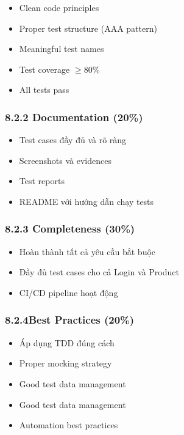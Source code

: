 \documentclass[a4paper,12pt]{article}
\begin{document}
\begin{itemize}
    \item Clean code principles
    \item Proper test structure (AAA pattern)
    \item Meaningful test names
    \item Test coverage $\geq 80\%$
    \item All tests pass
\end{itemize}

\subsubsection{8.2.2 Documentation (20\%)}

\begin{itemize}
    \item Test cases đầy đủ và rõ ràng
    \item Screenshots và evidences
    \item Test reports
    \item README với hướng dẫn chạy tests
\end{itemize}

\subsubsection{8.2.3 Completeness (30\%)}

\begin{itemize}
    \item Hoàn thành tất cả yêu cầu bắt buộc
    \item Đầy đủ test cases cho cả Login và Product
    \item CI/CD pipeline hoạt động
\end{itemize}

\subsubsection{8.2.4Best Practices (20\%)}

\begin{itemize}
    \item Áp dụng TDD đúng cách
    \item Proper mocking strategy
    \item Good test data management
    \item Good test data management
    \item Automation best practices
\end{itemize}
\end{document}
